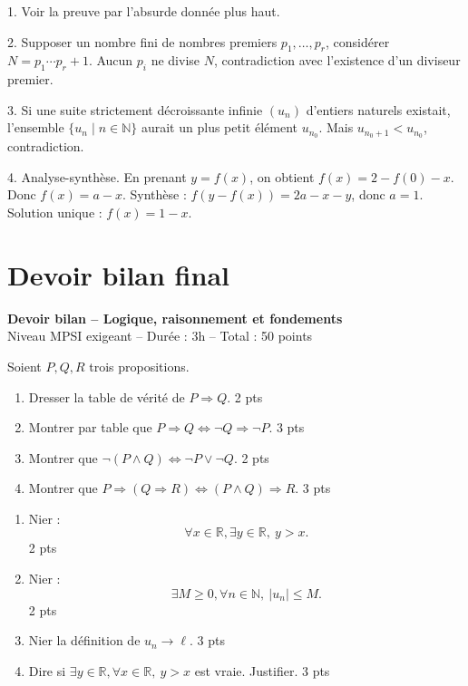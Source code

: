 \documentclass[11pt,a4paper]{article}
\newcommand{\N}{\mathbb{N}}
\newcommand{\R}{\mathbb{R}}
\newcommand{\non}{\neg}
\newcommand{\et}{\wedge}
\newcommand{\ou}{\vee}
\newcommand{\imp}{\Rightarrow}
\newcommand{\ssi}{\Longleftrightarrow}
\begin{document}
\begin{correctionbox}[Problème 5]
1. Voir la preuve par l'absurde donnée plus haut.

2. Supposer un nombre fini de nombres premiers \(p_1,\dots,p_r\), considérer \(N=p_1\cdots p_r+1\). Aucun \(p_i\) ne divise \(N\), contradiction avec l'existence d'un diviseur premier.

3. Si une suite strictement décroissante infinie \((u_n)\) d'entiers naturels existait, l'ensemble \(\{u_n\mid n\in\N\}\) aurait un plus petit élément \(u_{n_0}\). Mais \(u_{n_0+1}<u_{n_0}\), contradiction.

4. Analyse-synthèse. En prenant \(y=f(x)\), on obtient \(f(x)=2-f(0)-x\). Donc \(f(x)=a-x\). Synthèse : \(f(y-f(x))=2a-x-y\), donc \(a=1\). Solution unique : \(f(x)=1-x\).
\end{correctionbox}

\section{Devoir bilan final}

\begin{center}
{\Large\bfseries Devoir bilan -- Logique, raisonnement et fondements}\\[0.2cm]
Niveau MPSI exigeant -- Durée : 3h -- Total : 50 points
\end{center}

\begin{exercicebox}
Soient \(P,Q,R\) trois propositions.
\begin{enumerate}
    \item Dresser la table de vérité de \(P\imp Q\). \hfill 2 pts
    \item Montrer par table que \(P\imp Q\ssi\non Q\imp\non P\). \hfill 3 pts
    \item Montrer que \(\non(P\et Q)\ssi\non P\ou\non Q\). \hfill 2 pts
    \item Montrer que \(P\imp(Q\imp R)\ssi(P\et Q)\imp R\). \hfill 3 pts
\end{enumerate}
\end{exercicebox}

\begin{exercicebox}
\begin{enumerate}
    \item Nier :
    \[
    \forall x\in\R,\exists y\in\R,\ y>x.
    \]
    \hfill 2 pts
    \item Nier :
    \[
    \exists M\geq0,\forall n\in\N,\ |u_n|\leq M.
    \]
    \hfill 2 pts
    \item Nier la définition de \(u_n\to\ell\). \hfill 3 pts
    \item Dire si \(\exists y\in\R,\forall x\in\R,\ y>x\) est vraie. Justifier. \hfill 3 pts
\end{enumerate}
\end{exercicebox}
\end{document}
